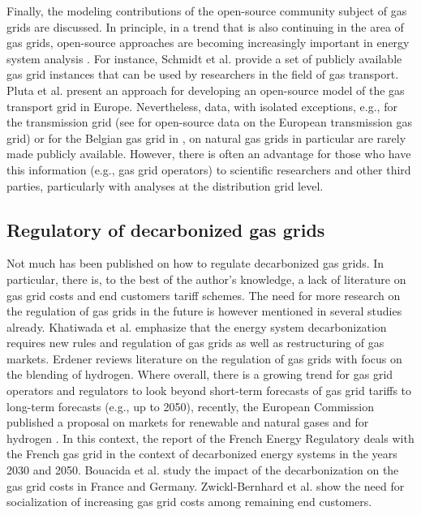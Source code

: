 Finally, the modeling contributions of the open-source community subject of gas grids are discussed. In principle, in a trend that is also continuing in the area of gas grids, open-source approaches are becoming increasingly important in energy system analysis \cite{hulk2018transparency}. For instance, Schmidt et al. \cite{schmidt2017gaslib} provide a set of publicly available gas grid instances that can be used by researchers in the field of gas transport. Pluta et al. \cite{pluta2022scigrid_gas} present an approach for developing an open-source model of the gas transport grid in Europe. Nevertheless, data, with isolated exceptions, e.g., for the transmission grid (see \cite{entsog} for open-source data on the European transmission gas grid) or for the Belgian gas grid in \cite{de2000gas}, on natural gas grids in particular are rarely made publicly available. However, there is often an advantage for those who have this information (e.g., gas grid operators) to scientific researchers and other third parties, particularly with analyses at the distribution grid level. 

\subsection{Regulatory of decarbonized gas grids}\label{tariffs}
Not much has been published on how to regulate decarbonized gas grids. In particular, there is, to the best of the author's knowledge, a lack of literature on gas grid costs and end customers tariff schemes. The need for more research on the regulation of gas grids in the future is however mentioned in several studies already. Khatiwada et al. \cite{khatiwada2022decarbonization} emphasize that the energy system decarbonization requires new rules and regulation of gas grids as well as restructuring of gas markets. Erdener \cite{erdener2023review} reviews literature on the regulation of gas grids with focus on the blending of hydrogen. Where overall, there is a growing trend for gas grid operators and regulators to look beyond short-term forecasts of gas grid tariffs to long-term forecasts (e.g., up to 2050), recently, the European Commission published a proposal on markets for renewable and natural gases and for hydrogen \cite{propsal_gas_market}. In this context, the report of the French Energy Regulatory \cite{french} deals with the French gas grid in the context of decarbonized energy systems in the years 2030 and 2050. Bouacida et al. \cite{bouacida2022impacts} study the impact of the decarbonization on the gas grid costs in France and Germany. Zwickl-Bernhard et al. \cite{zwickl2023design} show the need for socialization of increasing gas grid costs among remaining end customers.\vspace{0.3cm}

